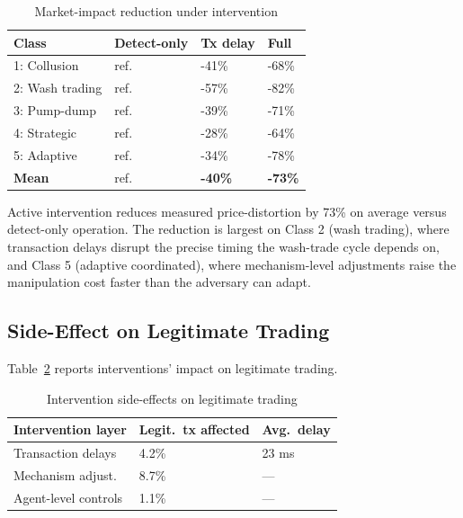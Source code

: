 \documentclass[sigconf,nonacm]{acmart}
\begin{document}
\begin{table}[h]
\caption{Market-impact reduction under intervention}
\label{tab:marketimpact}
\small
\begin{tabularx}{\columnwidth}{@{}p{2.6cm}X X X@{}}
\toprule
\textbf{Class} & \textbf{Detect-only} & \textbf{Tx delay} & \textbf{Full} \\
\midrule
1: Collusion    & ref. & -41\% & -68\% \\
2: Wash trading & ref. & -57\% & -82\% \\
3: Pump-dump    & ref. & -39\% & -71\% \\
4: Strategic    & ref. & -28\% & -64\% \\
5: Adaptive     & ref. & -34\% & -78\% \\
\midrule
\textbf{Mean}   & ref. & \textbf{-40\%} & \textbf{-73\%} \\
\bottomrule
\end{tabularx}
\end{table}

Active intervention reduces measured price-distortion by 73\% on
average versus detect-only operation. The reduction is largest on
Class 2 (wash trading), where transaction delays disrupt the
precise timing the wash-trade cycle depends on, and Class 5
(adaptive coordinated), where mechanism-level adjustments raise
the manipulation cost faster than the adversary can adapt.

\subsection{Side-Effect on Legitimate Trading}

Table~\ref{tab:sideeffect} reports interventions' impact on
legitimate trading.

\begin{table}[h]
\caption{Intervention side-effects on legitimate trading}
\label{tab:sideeffect}
\small
\begin{tabularx}{\columnwidth}{@{}p{3.0cm}X X@{}}
\toprule
\textbf{Intervention layer} & \textbf{Legit.\ tx affected} & \textbf{Avg.\ delay} \\
\midrule
Transaction delays  & 4.2\% & 23 ms \\
Mechanism adjust.\  & 8.7\% & --- \\
Agent-level controls & 1.1\% & --- \\
\bottomrule
\end{tabularx}
\end{table}
\end{document}

